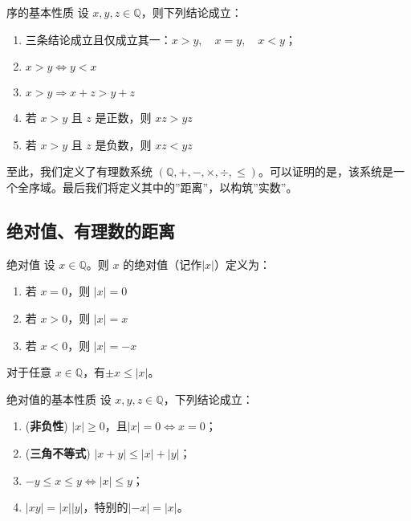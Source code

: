 \begin{theorem}{序的基本性质}{}
	设 $x,y,z\in \mathbb Q$，则下列结论成立：
	\begin{enumerate}
		\item 三条结论成立且仅成立其一：$x> y, \quad x=y,\quad x < y$；
		\item $x>y\iff y < x$
		\item $x>y \Rightarrow x+z > y+z$
		\item 若 $x > y$ 且 $z$ 是正数，则 $xz > yz$
		\item 若 $x > y$ 且 $z$ 是负数，则 $xz < yz$
	\end{enumerate}
\end{theorem}

至此，我们定义了有理数系统 $(\mathbb Q, +, -, \times , \div, \le)$。可以证明的是，该系统是一个全序域。最后我们将定义其中的''距离''，以构筑''实数''。

\subsection{绝对值、有理数的距离}

\begin{definition}{绝对值}{}
	设 $x\in \mathbb Q$。则 $x$ 的绝对值（记作$|x|$）定义为：
	\begin{enumerate}
		\item 若 $x=0$，则 $|x|=0$
		\item 若 $x > 0$，则 $|x|=x$
		\item 若 $x < 0$，则 $|x|=-x$
	\end{enumerate}
\end{definition}

\begin{corollary}{}{}
	对于任意 $x\in \mathbb Q$，有$\pm x \le |x|$。
\end{corollary}

\begin{theorem}{绝对值的基本性质}{}
	设 $x,y,z\in \mathbb Q$，下列结论成立：
	\begin{enumerate}
		\item (\textbf{非负性}) $|x| \ge 0$，且$|x|=0\iff x=0$；
		\item (\textbf{三角不等式}) $|x+y|\le |x| + |y|$；
		\item $-y \le x \le y \iff |x| \le y$；
		\item $|xy| = |x| |y|$，特别的$|-x| = |x|$。
	\end{enumerate}
\end{theorem}

